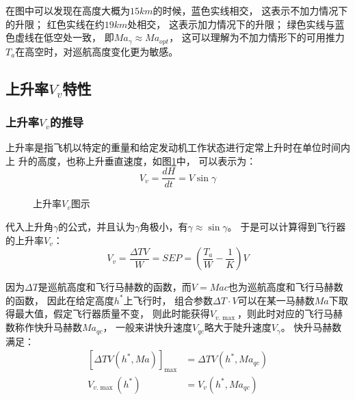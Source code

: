 在图中可以发现在高度大概为$15km$的时候，蓝色实线相交，
这表示不加力情况下的升限；
红色实线在约$19km$处相交，
这表示加力情况下的升限；
绿色实线与蓝色虚线在低空处一致，
即$Ma_{\gamma}\approx Ma_{opt}$，
这可以理解为不加力情形下的可用推力$T_a$在高空时，对巡航高度变化更为敏感。

\subsection{上升率$V_v$特性}

\subsubsection{上升率$V_v$的推导}

上升率是指飞机以特定的重量和给定发动机工作状态进行定常上升时在单位时间内上
升的高度，也称上升垂直速度，如图\ref{上升率Vv图示}中，
可以表示为：
\begin{equation}
    V_v = \frac{dH}{dt} = V\sin\gamma
\end{equation}


\begin{figure}[H]
    \centering
    \caption{上升率$V_v$图示}
    \label{上升率Vv图示}
\end{figure}
代入上升角$\gamma$的公式，并且认为$\gamma$角极小，有$\gamma\approx \sin\gamma$。
于是可以计算得到飞行器的上升率$V_v$：
\begin{equation}
    V_v=\frac{\Delta T V}{W}= SEP = \left( \frac{T_a}{W} - \frac{1}{K} \right)V
\end{equation}

因为$\Delta T$是巡航高度和飞行马赫数的函数，而$V=Ma c$也为巡航高度和飞行马赫数的函数，
因此在给定高度$h^*$上飞行时，
组合参数$\Delta T \cdot V$可以在某一马赫数$Ma$下取得最大值，假定飞行器质量不变，
则此时能获得$V_{v.\max}$，则此时对应的飞行马赫数称作快升马赫数$Ma_{qc}$，
一般来讲快升速度$V_{qc}$略大于陡升速度$V_{\gamma}$。
快升马赫数满足：
\begin{equation}
    \begin{aligned}
        [\Delta T V(h^*,Ma)]_{\max} &= \Delta T V(h^*,Ma_{qc})\\
        V_{v.\max}(h^*) &= V_v(h^*, Ma_{qc})
    \end{aligned}
\end{equation}


